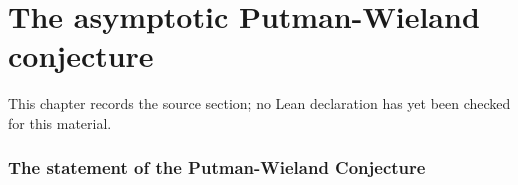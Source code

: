 \chapter{The asymptotic Putman-Wieland conjecture}
\label{canonical-representations-surface-groups-chapter-07}

\begin{remark}
\label{canonical-representations-surface-groups-chapter-07-source}
This chapter records the source section; no Lean declaration has yet been checked for this material.
\notready
\end{remark}

\label{section:Putman-Wieland}
\subsection{The statement of the Putman-Wieland Conjecture}
\label{subsection:geometric-setup}


